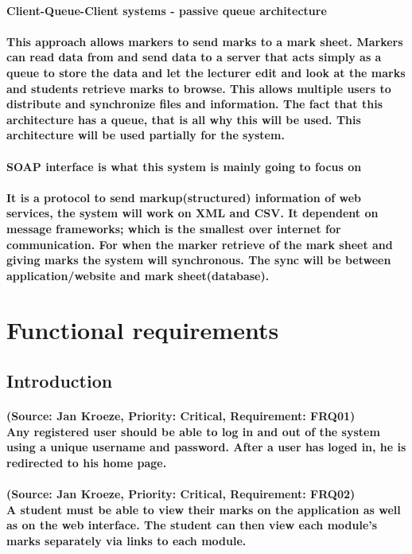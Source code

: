 \documentclass[12pt]{article}
\begin{document}
\paragraph{Client-Queue-Client systems - passive queue architecture}
\paragraph{This approach allows markers to send marks to a mark sheet. Markers can read data from and send data to a server that acts simply as a queue to store the data and let the lecturer edit and look at the marks and students retrieve marks to browse. This allows multiple users to distribute and synchronize files and information. The fact that this architecture has a queue, that is all why this will be used. This architecture will be used partially for the system. 
}
\paragraph{SOAP interface is what this system is mainly going to focus on }
\paragraph{It is a protocol to send markup(structured) information of web services, the system will work on XML and CSV. It dependent on message frameworks; which is the smallest over internet for communication. For when the marker retrieve of the mark sheet and giving marks the system will synchronous. The sync will be between application/website and mark sheet(database).
}
  \section{Functional requirements}
  \subsection{Introduction}
  \paragraph{(Source: Jan Kroeze, Priority: Critical, Requirement: FRQ01) \\
  Any registered user should be able to log in and out of the system using a unique username and password. After a user has loged in, he is redirected to his home page.}
  \paragraph{(Source: Jan Kroeze, Priority: Critical, Requirement: FRQ02) \\
  A student must be able to view their marks on the application as well as on  the web interface. The student can then view each module's marks separately via links to each module. }
\end{document}
